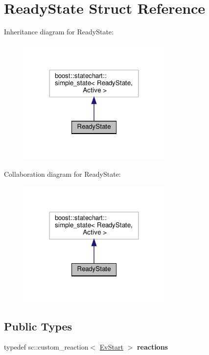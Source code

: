 \hypertarget{structReadyState}{}\section{Ready\+State Struct Reference}
\label{structReadyState}


Inheritance diagram for Ready\+State\+:
\nopagebreak
\begin{figure}[H]
\begin{center}
\leavevmode
\includegraphics[width=216pt]{structReadyState__inherit__graph}
\end{center}
\end{figure}


Collaboration diagram for Ready\+State\+:
\nopagebreak
\begin{figure}[H]
\begin{center}
\leavevmode
\includegraphics[width=216pt]{structReadyState__coll__graph}
\end{center}
\end{figure}
\subsection*{Public Types}
\begin{DoxyCompactItemize}
\item 
\mbox{\label{structReadyState_a050290b91f18ade78ce2771ce5a6f403}} 
typedef sc\+::custom\+\_\+reaction$<$ \hyperlink{structEvStart}{Ev\+Start} $>$ {\bfseries reactions}
\end{DoxyCompactItemize}

